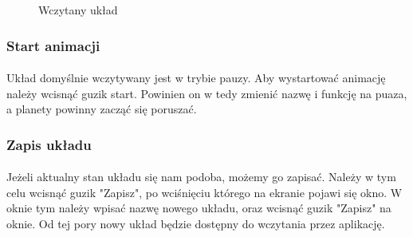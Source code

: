 \begin{figure}[ht!]
\centering
{}
\caption{Wczytany układ}
\label{fig:inst_02}
\end{figure}

\subsubsection{Start animacji}\label{ssub:start animacji}
\paragraph{}

Układ domyślnie wczytywany jest w trybie pauzy. Aby wystartować animację należy wcisnąć guzik start. Powinien on w tedy zmienić nazwę i funkcję na puaza, a planety powinny zacząć się poruszać.


\subsubsection{Zapis układu}\label{ssub:zapis ukladu}
\paragraph{}

Jeżeli aktualny stan układu się nam podoba, możemy go zapisać. Należy w tym celu wcisnąć guzik "Zapisz", po wciśnięciu którego na ekranie pojawi się okno. W oknie tym należy wpisać nazwę nowego układu, oraz wcisnąć guzik "Zapisz" na oknie. Od tej pory nowy układ będzie dostępny do wczytania przez aplikację.


